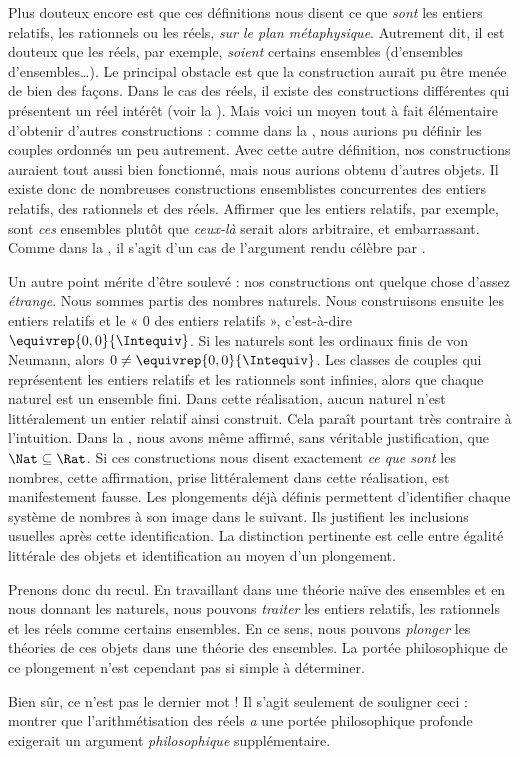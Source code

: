 \documentclass[../../../include/open-logic-section]{subfiles}
\begin{document}
Plus douteux encore est que ces définitions nous disent ce que
\emph{sont} les entiers relatifs, les rationnels ou les réels,
\emph{sur le plan métaphysique}. Autrement dit, il est douteux que
les réels, par exemple, \emph{soient} certains ensembles
(d'ensembles d'ensembles\ldots). Le principal obstacle est que
la construction aurait pu être menée de bien des façons. Dans le
cas des réels, il existe des constructions différentes qui présentent
un réel intérêt (voir la ). Mais voici un moyen
tout à fait élémentaire d'obtenir d'autres constructions : comme
dans la , nous aurions pu définir les couples
ordonnés un peu autrement. Avec cette autre définition, nos
constructions auraient tout aussi bien fonctionné, mais nous aurions
obtenu d'autres objets. Il existe donc de nombreuses constructions
ensemblistes concurrentes des entiers relatifs, des rationnels et
des réels. Affirmer que les entiers relatifs, par exemple, sont
\emph{ces} ensembles plutôt que \emph{ceux-là} serait alors arbitraire,
et embarrassant. Comme dans la , il s'agit
d'un cas de l'argument rendu célèbre par \citealt{Benacerraf1965}.

Un autre point mérite d'être soulevé : nos constructions ont quelque
chose d'assez \emph{étrange}. Nous sommes partis des nombres naturels.
Nous construisons ensuite les entiers relatifs et le « $0$ des entiers
relatifs », c'est-à-dire $\equivrep{0,0}{\Intequiv}$.
Si les naturels sont les ordinaux finis de von Neumann, alors
$0\neq\equivrep{0,0}{\Intequiv}$. Les classes de couples qui
représentent les entiers relatifs et les rationnels sont infinies,
alors que chaque naturel est un ensemble fini. Dans cette réalisation,
aucun naturel n’est littéralement un entier relatif ainsi construit.
Cela paraît pourtant très contraire à l'intuition.
Dans la , nous avons même affirmé,
sans véritable justification, que $\Nat\subseteq\Rat$.
Si ces constructions nous disent exactement \emph{ce que sont}
les nombres, cette affirmation, prise littéralement dans cette
réalisation, est manifestement fausse.
%
Les plongements déjà définis permettent d’identifier chaque système
de nombres à son image dans le suivant. Ils justifient les inclusions
usuelles après cette identification. La distinction pertinente est
celle entre égalité littérale des objets et identification au moyen
d'un plongement.
%
%
%
%

Prenons donc du recul. En travaillant dans une théorie naïve des
ensembles et en nous donnant les naturels, nous pouvons \emph{traiter}
les entiers relatifs, les rationnels et les réels comme certains
ensembles. En ce sens, nous pouvons \emph{plonger} les théories de
ces objets dans une théorie des ensembles. La portée philosophique
de ce plongement n'est cependant pas si simple à déterminer.

Bien sûr, ce n'est pas le dernier mot !{} Il s'agit seulement de
souligner ceci : montrer que l'arithmétisation des réels \emph{a}
une portée philosophique profonde exigerait un argument
\emph{philosophique} supplémentaire.

\end{document}
